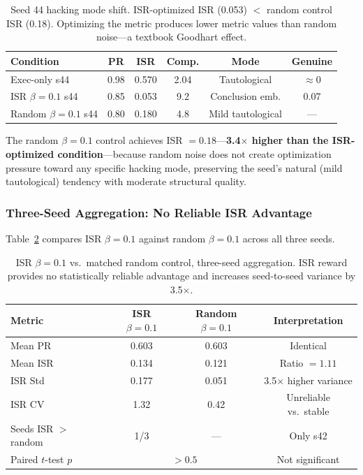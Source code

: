 \documentclass[11pt,a4paper]{article}
\begin{document}
\begin{table}[t]
\centering
\small
\begin{tabular}{lccccc}
\toprule
\textbf{Condition} & \textbf{PR} & \textbf{ISR} & \textbf{Comp.} & \textbf{Mode} & \textbf{Genuine} \\
\midrule
Exec-only s44 & 0.98 & 0.570 & 2.04 & Tautological & $\approx 0$ \\
ISR $\beta{=}0.1$ s44 & 0.85 & 0.053 & 9.2 & Conclusion emb. & 0.07 \\
Random $\beta{=}0.1$ s44 & 0.80 & 0.180 & 4.8 & Mild tautological & --- \\
\bottomrule
\end{tabular}
\caption{Seed 44 hacking mode shift. ISR-optimized ISR (0.053) $<$ random control ISR (0.18). Optimizing the metric produces lower metric values than random noise---a textbook Goodhart effect.}
\label{tab:s44_shift}
\end{table}

The random $\beta{=}0.1$ control achieves ISR $= 0.18$---\textbf{3.4$\times$ higher than the ISR-optimized condition}---because random noise does not create optimization pressure toward any specific hacking mode, preserving the seed's natural (mild tautological) tendency with moderate structural quality.

\subsubsection{Three-Seed Aggregation: No Reliable ISR Advantage}

Table~\ref{tab:aggregate} compares ISR $\beta{=}0.1$ against random $\beta{=}0.1$ across all three seeds.

\begin{table}[t]
\centering
\small
\begin{tabular}{lccc}
\toprule
\textbf{Metric} & \textbf{ISR $\beta{=}0.1$} & \textbf{Random $\beta{=}0.1$} & \textbf{Interpretation} \\
\midrule
Mean PR & 0.603 & 0.603 & Identical \\
Mean ISR & 0.134 & 0.121 & Ratio $= 1.11$ \\
ISR Std & 0.177 & 0.051 & 3.5$\times$ higher variance \\
ISR CV & 1.32 & 0.42 & Unreliable vs.\ stable \\
Seeds ISR $>$ random & 1/3 & --- & Only s42 \\
Paired $t$-test $p$ & \multicolumn{2}{c}{$> 0.5$} & Not significant \\
\bottomrule
\end{tabular}
\caption{ISR $\beta{=}0.1$ vs.\ matched random control, three-seed aggregation. ISR reward provides no statistically reliable advantage and increases seed-to-seed variance by 3.5$\times$.}
\label{tab:aggregate}
\end{table}
\end{document}
